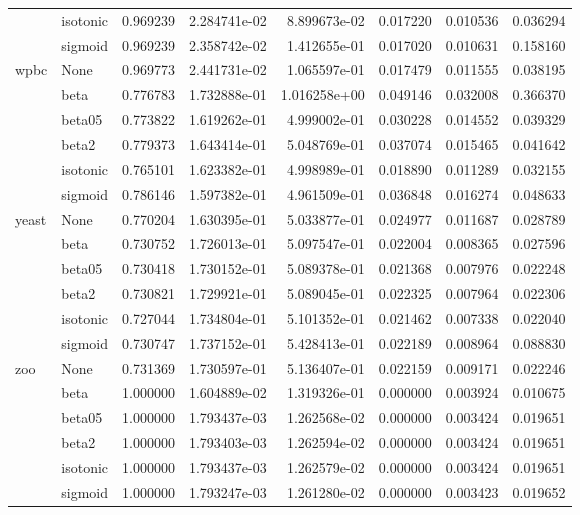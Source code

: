\begin{tabular}{llrrrrrr}
        & isotonic &  0.969239 &  2.284741e-02 &  8.899673e-02 &  0.017220 &  0.010536 &  0.036294 \\
        & sigmoid &  0.969239 &  2.358742e-02 &  1.412655e-01 &  0.017020 &  0.010631 &  0.158160 \\
wpbc & None &  0.969773 &  2.441731e-02 &  1.065597e-01 &  0.017479 &  0.011555 &  0.038195 \\
        & beta &  0.776783 &  1.732888e-01 &  1.016258e+00 &  0.049146 &  0.032008 &  0.366370 \\
        & beta05 &  0.773822 &  1.619262e-01 &  4.999002e-01 &  0.030228 &  0.014552 &  0.039329 \\
        & beta2 &  0.779373 &  1.643414e-01 &  5.048769e-01 &  0.037074 &  0.015465 &  0.041642 \\
        & isotonic &  0.765101 &  1.623382e-01 &  4.998989e-01 &  0.018890 &  0.011289 &  0.032155 \\
        & sigmoid &  0.786146 &  1.597382e-01 &  4.961509e-01 &  0.036848 &  0.016274 &  0.048633 \\
yeast & None &  0.770204 &  1.630395e-01 &  5.033877e-01 &  0.024977 &  0.011687 &  0.028789 \\
        & beta &  0.730752 &  1.726013e-01 &  5.097547e-01 &  0.022004 &  0.008365 &  0.027596 \\
        & beta05 &  0.730418 &  1.730152e-01 &  5.089378e-01 &  0.021368 &  0.007976 &  0.022248 \\
        & beta2 &  0.730821 &  1.729921e-01 &  5.089045e-01 &  0.022325 &  0.007964 &  0.022306 \\
        & isotonic &  0.727044 &  1.734804e-01 &  5.101352e-01 &  0.021462 &  0.007338 &  0.022040 \\
        & sigmoid &  0.730747 &  1.737152e-01 &  5.428413e-01 &  0.022189 &  0.008964 &  0.088830 \\
zoo & None &  0.731369 &  1.730597e-01 &  5.136407e-01 &  0.022159 &  0.009171 &  0.022246 \\
        & beta &  1.000000 &  1.604889e-02 &  1.319326e-01 &  0.000000 &  0.003924 &  0.010675 \\
        & beta05 &  1.000000 &  1.793437e-03 &  1.262568e-02 &  0.000000 &  0.003424 &  0.019651 \\
        & beta2 &  1.000000 &  1.793403e-03 &  1.262594e-02 &  0.000000 &  0.003424 &  0.019651 \\
        & isotonic &  1.000000 &  1.793437e-03 &  1.262579e-02 &  0.000000 &  0.003424 &  0.019651 \\
        & sigmoid &  1.000000 &  1.793247e-03 &  1.261280e-02 &  0.000000 &  0.003423 &  0.019652 \\
\bottomrule
\end{tabular}
